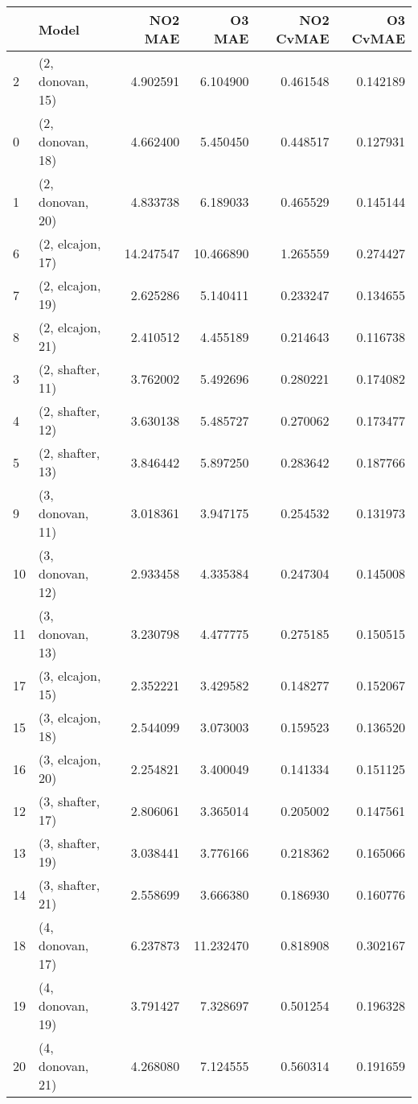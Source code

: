 \begin{tabular}{llrrrr}
\toprule
{} &             Model &    NO2 MAE &     O3 MAE &  NO2 CvMAE &  O3 CvMAE \\
\midrule
2  &  (2, donovan, 15) &   4.902591 &   6.104900 &   0.461548 &  0.142189 \\
0  &  (2, donovan, 18) &   4.662400 &   5.450450 &   0.448517 &  0.127931 \\
1  &  (2, donovan, 20) &   4.833738 &   6.189033 &   0.465529 &  0.145144 \\
6  &  (2, elcajon, 17) &  14.247547 &  10.466890 &   1.265559 &  0.274427 \\
7  &  (2, elcajon, 19) &   2.625286 &   5.140411 &   0.233247 &  0.134655 \\
8  &  (2, elcajon, 21) &   2.410512 &   4.455189 &   0.214643 &  0.116738 \\
3  &  (2, shafter, 11) &   3.762002 &   5.492696 &   0.280221 &  0.174082 \\
4  &  (2, shafter, 12) &   3.630138 &   5.485727 &   0.270062 &  0.173477 \\
5  &  (2, shafter, 13) &   3.846442 &   5.897250 &   0.283642 &  0.187766 \\
9  &  (3, donovan, 11) &   3.018361 &   3.947175 &   0.254532 &  0.131973 \\
10 &  (3, donovan, 12) &   2.933458 &   4.335384 &   0.247304 &  0.145008 \\
11 &  (3, donovan, 13) &   3.230798 &   4.477775 &   0.275185 &  0.150515 \\
17 &  (3, elcajon, 15) &   2.352221 &   3.429582 &   0.148277 &  0.152067 \\
15 &  (3, elcajon, 18) &   2.544099 &   3.073003 &   0.159523 &  0.136520 \\
16 &  (3, elcajon, 20) &   2.254821 &   3.400049 &   0.141334 &  0.151125 \\
12 &  (3, shafter, 17) &   2.806061 &   3.365014 &   0.205002 &  0.147561 \\
13 &  (3, shafter, 19) &   3.038441 &   3.776166 &   0.218362 &  0.165066 \\
14 &  (3, shafter, 21) &   2.558699 &   3.666380 &   0.186930 &  0.160776 \\
18 &  (4, donovan, 17) &   6.237873 &  11.232470 &   0.818908 &  0.302167 \\
19 &  (4, donovan, 19) &   3.791427 &   7.328697 &   0.501254 &  0.196328 \\
20 &  (4, donovan, 21) &   4.268080 &   7.124555 &   0.560314 &  0.191659 \\

\end{tabular}
